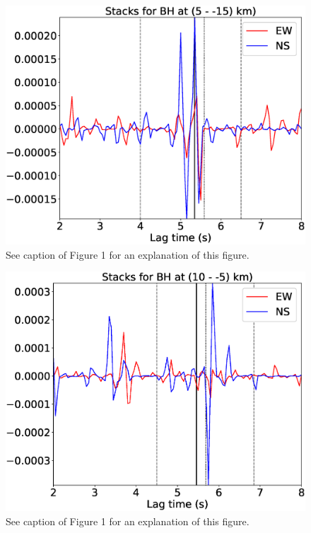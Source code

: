 \documentclass[letterpaper, 12pt]{article}
\begin{document}
\begin{figure}[H]
\includegraphics[width=\linewidth]{figures/intervals/BH_005_-15_stacks.eps}
\caption{See caption of Figure 1 for an explanation of this figure.}
\end{figure}

\begin{figure}[H]
\includegraphics[width=\linewidth]{figures/intervals/BH_010_-05_stacks.eps}
\caption{See caption of Figure 1 for an explanation of this figure.}
\end{figure}
\end{document}
